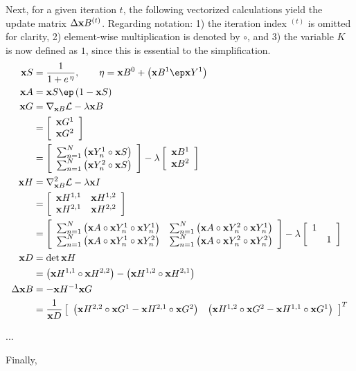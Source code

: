 Next, for a given iteration $t$, the following vectorized calculations yield the update matrix $\Delta\mathbf{x}{B}^{(t)}$.
Regarding notation:
1) the iteration index ${}^{(t)}$ is omitted for clarity,
2) element-wise multiplication is denoted by $\circ$, and
3) the variable $K$ is now defined as $1$, since this is essential to the simplification.
\begin{align}
\x{S} &= \frac{1}{1+e^{\et\eta}},\qquad \eta = \x{B}^0 + \left(\x{B}^1\ep\x{Y}^1\right)\\
\x{A} &= \x{S}\ep\left(1-\x{S}\right)\\
\x{G} &= \nabla_{\x{B}}\L - \lambda\x{B} \nonumber \\
&= \left[\begin{array}{c}
\x{G}^1 \\ \x{G}^2
\end{array}\right] \nonumber \\
&= \left[\begin{array}{c}
\sum_{n=1}^{N}\left( \x{Y}_n^1\circ\x{S} \right) \\
\sum_{n=1}^{N}\left( \x{Y}_n^2\circ\x{S} \right)
\end{array}\right] - \lambda\left[\begin{array}{c} \x{B}^1 \\ \x{B}^2\end{array}\right]\\
\x{H} &= \nabla_{\x{B}}^2\L -\lambda\x{I} \nonumber \\
&= \left[\begin{array}{cc}
\x{H}^{1,1} & \x{H}^{1,2} \\ \x{H}^{2,1} & \x{H}^{2,2}
\end{array}\right] \nonumber \\
&= \left[\begin{array}{cc}
\sum_{n=1}^{N}\left( \x{A}\circ\x{Y}_n^1\circ\x{Y}_n^1 \right) & 
\sum_{n=1}^{N}\left( \x{A}\circ\x{Y}_n^2\circ\x{Y}_n^1 \right) \\
\sum_{n=1}^{N}\left( \x{A}\circ\x{Y}_n^1\circ\x{Y}_n^2 \right) & 
\sum_{n=1}^{N}\left( \x{A}\circ\x{Y}_n^2\circ\x{Y}_n^2 \right)
\end{array}\right] - \lambda\left[\begin{array}{cc} 1 & \\ & 1\end{array}\right]\\
\x{D} &= \det{\x{H}} \nonumber \\
&= \left(\x{H}^{1,1}\circ\x{H}^{2,2}\right) - \left(\x{H}^{1,2}\circ\x{H}^{2,1}\right) \\
\Delta\x{B} &= -\x{H}^{-1}\x{G} \nonumber \\
&= \dfrac{1}{\x{D}} \left[\begin{array}{cc}
\left(\x{H}^{2,2}\circ\x{G}^{1} - \x{H}^{2,1}\circ\x{G}^{2} \right) & 
\left(\x{H}^{1,2}\circ\x{G}^{2} - \x{H}^{1,1}\circ\x{G}^{1} \right)
\end{array}\right]^{T}
\end{align}
\par...\par
Finally, 
